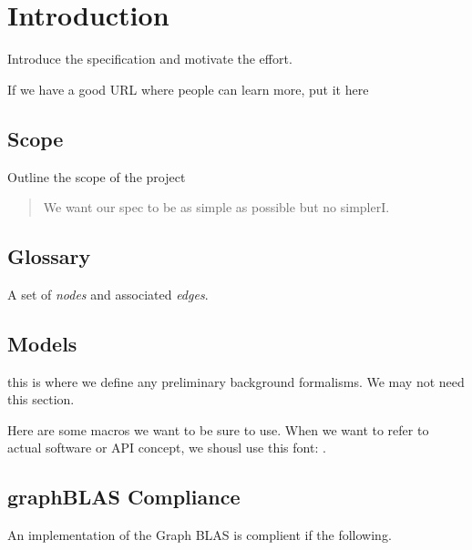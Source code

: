 %


\chapter{Introduction}
\label{chap:introduction}
Introduce the specification and motivate the effort.

If we have a good URL where people can learn more, put it here



\section{Scope}
\label{sec:Scope}
Outline the scope of the project

\begin{quote}
We want our spec to be as simple as possible but no simplerI.
\end{quote}


\section{Glossary}
\label{sec:Glossary}

\glossarydefstart
A set of  \emph{nodes} and associated \emph{edges}.
\glossarydefend


\section{Models}
\label{sec:Models}
this is where we define any preliminary background formalisms.  We may not need this section.

Here are some macros we want to be sure to use.    When we want to refer to actual software or API concept,
we shousl use this font: .




\section{graphBLAS  Compliance}
\label{sec:GraphBLAS Compliance}
An implementation of the Graph BLAS is complient if the following.   

